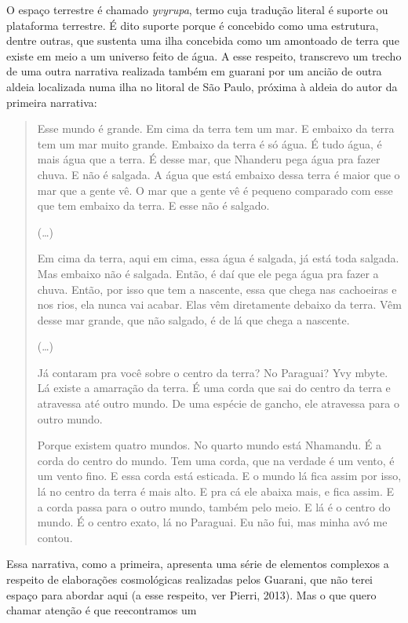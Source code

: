 O espaço terrestre é chamado \emph{yvyrupa}, termo cuja tradução literal é
suporte ou plataforma terrestre. É dito suporte porque é concebido como
uma estrutura, dentre outras, que sustenta uma ilha concebida como um
amontoado de terra que existe em meio a um universo feito de água. A
esse respeito, transcrevo um trecho de uma outra narrativa realizada
também em guarani por um ancião de outra aldeia localizada numa ilha no
litoral de São Paulo, próxima à aldeia do autor da primeira narrativa:

\begin{quotation}
Esse mundo é grande. Em cima da terra tem um mar. E embaixo da terra tem
um mar muito grande. Embaixo da terra é só água. É tudo água, é mais
água que a terra. É desse mar, que Nhanderu pega água pra fazer chuva.
E não é salgada. A água que está embaixo dessa terra é maior que o mar
que a gente vê. O mar que a gente vê é pequeno comparado com esse que
tem embaixo da terra. E esse não é salgado.

(\ldots{})

Em cima da terra, aqui em cima, essa água é salgada, já está toda
salgada. Mas embaixo não é salgada. Então, é daí que ele pega água pra
fazer a chuva. Então, por isso que tem a nascente, essa que chega nas
cachoeiras e nos rios, ela nunca vai acabar. Elas vêm diretamente
debaixo da terra. Vêm desse mar grande, que não salgado, é de lá que
chega a nascente.

(\ldots{}) 

Já contaram pra você sobre o centro da terra? No Paraguai? Yvy mbyte. Lá
existe a amarração da terra. É uma corda que sai do centro da terra e
atravessa até outro mundo. De uma espécie de gancho, ele atravessa para
o outro mundo.

Porque existem quatro mundos. No quarto mundo está Nhamandu. É a corda
do centro do mundo. Tem uma corda, que na verdade é um vento, é um
vento fino. E essa corda está esticada. E o mundo lá fica assim por
isso, lá no centro da terra é mais alto. E pra cá ele abaixa mais, e
fica assim. E a corda passa para o outro mundo, também pelo meio. E lá
é o centro do mundo. É o centro exato, lá no Paraguai. Eu não fui, mas
minha avó me contou.

\end{quotation}
Essa narrativa, como a primeira, apresenta uma série de elementos
complexos a respeito de elaborações cosmológicas realizadas pelos
Guarani, que não terei espaço para abordar aqui (a esse respeito, ver
Pierri, 2013). Mas o que quero chamar atenção é que reecontramos um
